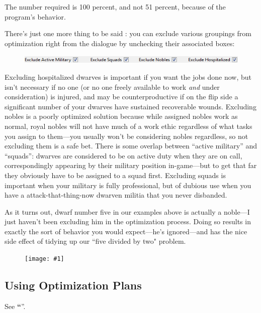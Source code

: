 \documentclass[]{article}
\newcommand{\jump}[1] {\textbf{``\nameref{sec:#1}}''}
\newcommand{\fullfigure}[1] {
\begin{figure}[h!]
\texttt{[image: \#1]}
\end{figure}
}
\begin{document}
The number required is 100 percent, and not 51 percent, because of the program's behavior.

There's just one more thing to be said%
: you can exclude various groupings from optimization right from the dialogue by unchecking their
associated boxes:
\begin{figure}[h!] \centering \includegraphics[scale=1]{Sec4Fig6}
\end{figure}

Excluding hospitalized dwarves is important if you want the jobs done now, but isn't necessary if no one
(or no one freely available to work \emph{and} under consideration) is injured, and may be
counterproductive if on the flip side a significant number of your dwarves have sustained recoverable
wounds. Excluding nobles is a poorly optimized solution because while assigned nobles work as normal,
royal nobles will not have much of a work ethic regardless of what tasks you assign to them---you usually
won't be considering nobles regardless, so not excluding them is a safe bet. There is some overlap
between ``active military'' and ``squads'': dwarves are considered to be on active duty when they are on
call, correspondingly appearing by their military position in-game---but to get that far they obviously
have to be assigned to a squad first. Excluding squads is important when your military is fully
professional, but of dubious use when you have a attack-that-thing-now dwarven militia that you never
disbanded.

As it turns out, dwarf number five in our examples above is actually a noble---I just haven't been
excluding him in the optimization process. Doing so results in exactly the sort of behavior you would
expect---he's ignored---and has the nice side effect of tidying up our ``five divided by two" problem.
\fullfigure{Sec4Fig15}

\subsection{Using Optimization Plans}
\label{Using Optimization Plans}

See \jump{Putting it all Together}.

% 
% 
\end{document}
